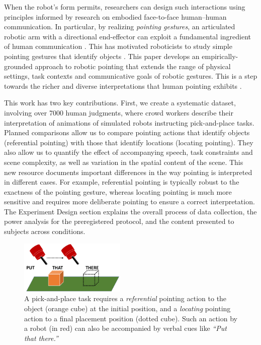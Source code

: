 \documentclass[letterpaper]{article} %
\begin{document}
When the robot's form permits, researchers can design such interactions using principles informed by research on embodied face-to-face human--human communication.  In particular, by realizing \emph{pointing gestures}, an articulated robotic arm with a directional end-effector can exploit a fundamental ingredient of human communication \cite{kita2003pointing}.  This has motivated roboticists to study simple pointing gestures that identify objects \cite{han2018placing,holladay2014legible,zhao2016experimental}.   This paper develops an empirically-grounded approach to robotic pointing that extends the range of physical settings, task contexts and communicative goals of robotic gestures. This is a step towards the richer and diverse interpretations that human pointing exhibits \cite{kendon:2004}.


This work has two key contributions.  First, we create a systematic dataset, involving over 7000 human judgments, where crowd workers describe their interpretation of animations of simulated robots instructing pick-and-place tasks.  Planned comparisons allow us to compare pointing actions that identify objects (referential pointing) with those that identify locations (locating pointing). They also allow us to quantify the effect of accompanying speech, task constraints and scene complexity, as well as variation in the spatial content of the scene.  This new resource documents important differences in the way pointing is interpreted in different cases.  For example, referential pointing is typically robust to the exactness of the pointing gesture, whereas locating pointing is much more sensitive and requires more deliberate pointing to ensure a correct interpretation.  The Experiment Design section explains the overall process of data collection, the power analysis for the preregistered protocol, and the content presented to subjects across conditions. 

\begin{figure}[t]
    \centering
    \includegraphics[width=0.45\textwidth, trim={0 0.3in 0 0in},clip]{putthatthere2.png}
    \caption{A pick-and-place task requires a \textit{referential} pointing action to the object (orange cube) at the initial position, and a \textit{locating} pointing action to a final placement position (dotted cube). Such an action by a robot (in red) can also be accompanied by verbal cues like \textit{``Put that there.''}}
    \label{fig:pap}
\end{figure}
\end{document}
